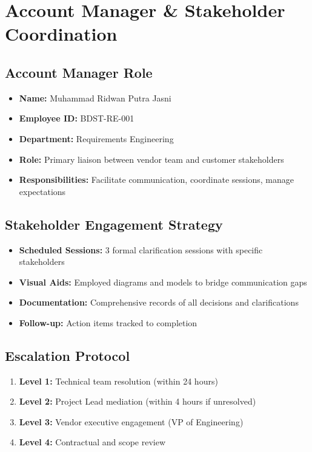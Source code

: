 \documentclass[12pt,a4paper]{article}
\begin{document}
\newpage

\section{Account Manager \& Stakeholder Coordination}
\label{sec:account}

\subsection{Account Manager Role}
\begin{itemize}
\item \textbf{Name:} Muhammad Ridwan Putra Jasni
\item \textbf{Employee ID:} BDST-RE-001
\item \textbf{Department:} Requirements Engineering
\item \textbf{Role:} Primary liaison between vendor team and customer stakeholders
\item \textbf{Responsibilities:} Facilitate communication, coordinate sessions, manage expectations
\end{itemize}

\subsection{Stakeholder Engagement Strategy}
\begin{itemize}
\item \textbf{Scheduled Sessions:} 3 formal clarification sessions with specific stakeholders
\item \textbf{Visual Aids:} Employed diagrams and models to bridge communication gaps
\item \textbf{Documentation:} Comprehensive records of all decisions and clarifications
\item \textbf{Follow-up:} Action items tracked to completion
\end{itemize}

\subsection{Escalation Protocol}
\begin{enumerate}
\item \textbf{Level 1:} Technical team resolution (within 24 hours)
\item \textbf{Level 2:} Project Lead mediation (within 4 hours if unresolved)
\item \textbf{Level 3:} Vendor executive engagement (VP of Engineering)
\item \textbf{Level 4:} Contractual and scope review
\end{enumerate}
\end{document}
